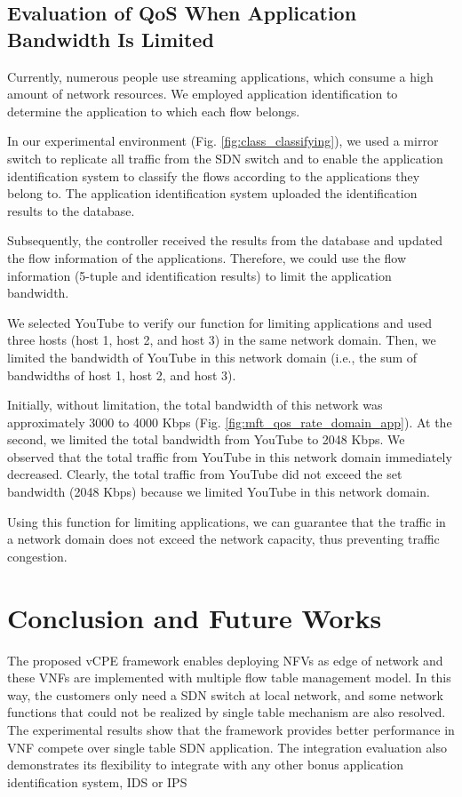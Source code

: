 \documentclass[conference]{IEEEtran}
\begin{document}
\subsection{Evaluation of QoS When Application Bandwidth Is Limited}
Currently, numerous people use streaming applications, which consume a high amount of network resources. We employed application identification to determine the application to which each flow belongs.

In our experimental environment (Fig. \ref{fig:class_classifying}), we used a mirror switch to replicate all traffic from the SDN switch and to enable the application identification system to classify the flows according to the applications they belong to. The application identification system uploaded the identification results to the database.


Subsequently, the controller received the results from the database and updated the flow information of the applications. Therefore, we could use the flow information (5-tuple and identification results) to limit the application bandwidth.

We selected YouTube to verify our function for limiting applications and used three hosts (host 1, host 2, and host 3) in the same network domain. Then, we limited the bandwidth of YouTube in this network domain (i.e., the sum of bandwidths of host 1, host 2, and host 3).

Initially, without limitation, the total bandwidth of this network was approximately 3000 to 4000 Kbps (Fig. \ref{fig:mft_qos_rate_domain_app}). At the  second, we limited the total bandwidth from YouTube to 2048 Kbps. We observed that the total traffic from YouTube in this network domain immediately decreased. Clearly, the total traffic from YouTube did not exceed the set bandwidth (2048 Kbps) because we limited YouTube in this network domain.

Using this function for limiting applications, we can guarantee that the traffic in a network domain does not exceed the network capacity, thus preventing traffic congestion.



\section{Conclusion and Future Works}
The proposed vCPE framework enables deploying NFVs as edge of network and these VNFs are implemented with multiple flow table management model. In this way, the customers only need a SDN switch at local network, and some network functions that could not be realized by single table mechanism are also resolved. The experimental results show that the framework provides better performance in VNF compete over single table SDN application. The integration evaluation also demonstrates its flexibility to integrate with any other bonus application identification system, IDS or IPS
\end{document}
